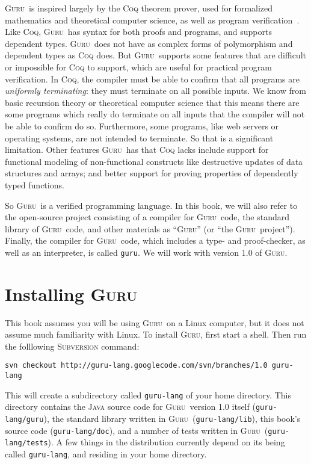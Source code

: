 \documentclass{book}[12pt]
\newcommand{\guru}[0]{\textsc{Guru}}
\begin{document}
\guru\ is inspired largely by the \textsc{Coq} theorem prover, used
for formalized mathematics and theoretical computer science, as well
as program verification~\cite{coq}.  Like \textsc{Coq}, \guru\ has
syntax for both proofs and programs, and supports dependent types.
\guru\ does not have as complex forms of polymorphism and dependent
types as \textsc{Coq} does. But \guru\ supports some features that are
difficult or impossible for \textsc{Coq} to support, which are useful
for practical program verification.  In \textsc{Coq}, the compiler
must be able to confirm that all programs are \emph{uniformly
terminating}: they must terminate on all possible inputs.  We know
from basic recursion theory or theoretical computer science that this
means there are some programs which really do terminate on all inputs
that the compiler will not be able to confirm do so.  Furthermore,
some programs, like web servers or operating systems, are not intended
to terminate.  So that is a significant limitation.  Other features
\guru\ has that \textsc{Coq} lacks include support for functional
modeling of non-functional constructs like destructive updates of data
structures and arrays; and better support for proving properties of
dependently typed functions.

So \guru\ is a verified programming language.  In this book, we will
also refer to the open-source project consisting of a compiler for
\guru\ code, the standard library of \guru\ code, and other materials
as ``\guru'' (or ``the \guru\ project'').  Finally, the compiler for
\guru\ code, which includes a type- and proof-checker, as well as an
interpreter, is called \texttt{guru}.  We will work with version 1.0
of \guru.

\section{Installing \guru}

This book assumes you will be using \guru\ on a Linux computer, but it
does not assume much familiarity with Linux.  To install \guru, first
start a shell. Then run the folllowing \textsc{Subversion} command:

\begin{verbatim}
svn checkout http://guru-lang.googlecode.com/svn/branches/1.0 guru-lang
\end{verbatim}

\noindent This will create a subdirectory called \texttt{guru-lang} of
your home directory.  This directory contains the \textsc{Java} source
code for \guru\ version 1.0 itself (\texttt{guru-lang/guru}), the
standard library written in \guru\ (\texttt{guru-lang/lib}), this
book's source code (\texttt{guru-lang/doc}), and a number of tests
written in \guru\ (\texttt{guru-lang/tests}).  A few things in the
distribution currently depend on its being called \texttt{guru-lang},
and residing in your home directory.
\end{document}
